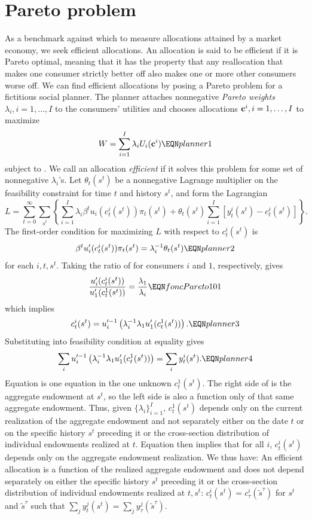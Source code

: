\section{Pareto problem}
As a benchmark against which to measure allocations attained by a
market  economy, we seek efficient allocations. An allocation is
said to be efficient if it is Pareto optimal, meaning that  it has the property
that any reallocation  that makes one consumer strictly better
off also makes one or more other consumers worse off. We can find
efficient allocations by posing a Pareto problem for a fictitious
social planner. The  planner attaches nonnegative {\it Pareto
weights\/} $\lambda_i, i=1, \ldots, I$ to the consumers' utilities and
chooses allocations ${\bf c}^i, i=1, \ldots, I$ to maximize
$$ W = \sum_{i=1}^I \lambda_i U_i({\bf c}^i)  \EQN planner1  $$
subject to .
We call an allocation {\it efficient\/}
if it solves this problem for some set of
nonnegative $\lambda_i$'s.
Let $\theta_t(s^t)$ be a nonnegative Lagrange multiplier on the
feasibility constraint 
for time  $t$ and  history  $s^t$,  and form
the Lagrangian
$$ L =
 \sum_{t=0}^\infty \sum_{s^t}
   \left\{  \sum_{i=1}^I \lambda_i \beta^t u_i(c_t^i(s^t)) \pi_t(s^t)
     + \theta_t(s^t) \sum_{i=1}^I [ y_t^i(s^t) - c_t^i(s^t) ]  \right\} . $$
The first-order condition for maximizing $L$
with respect to $c_t^i(s^t)$ is
$$ \beta^t u'_i(c_t^i(s^t))\pi_t(s^t) = \lambda_i^{-1}  \theta_t(s^t)
\EQN planner2 $$
for each $i, t, s^t$.  Taking the ratio of  for  consumers
$i$ and $1$, respectively,
gives
$$ {u'_i(c^i_t(s^t)) \over u'_1(c^1_t(s^t))} = {\lambda_1  \over \lambda_i}  \EQN foncPareto101 $$
which implies
$$ c_t^i(s^t) = u^{\prime -1}_i
    \left(\lambda_i^{-1} \lambda_1 u'_1(c_t^1(s^t)) \right). \EQN planner3
$$
Substituting  into feasibility condition  at
equality gives
$$ \sum_i u^{\prime -1}_i
    \left(\lambda_i^{-1} \lambda_1 u'_1(c_t^1(s^t)) \right)
  = \sum_i y_t^i(s^t)  . \EQN planner4 $$
Equation  is one equation in the one unknown  $c_t^1(s^t)$. The right
side of  is the  aggregate endowment at $s^t$, so the
left side is  also a function only of that same aggregate endowment. Thus, given $\{\lambda_i\}_{i=1}^I$,
$c_t^1(s^t)$ depends only on the current realization of the
aggregate endowment and not separately  either on  the date $t$ or on the specific history $s^t$
preceding it  or  the cross-section distribution of individual
endowments realized at $t$. Equation  then implies that for all $i$,
$c_t^i(s^t)$ depends only on the aggregate endowment realization.
We thus have:
\medskip
{} An efficient allocation is a function of
the realized aggregate endowment and  does not depend separately  on either the specific history $s^t$
preceding it or  the cross-section distribution of individual
endowments realized at $t, s^t$: $c_t^i(s^t)=c_\tau^i(\tilde
s^{\tau})$ for $s^t$ and $\tilde s^{\tau}$ such that $\sum_j
y_t^j(s^t) = \sum_j y_\tau^j(\tilde s^{\tau})$.
\medskip


